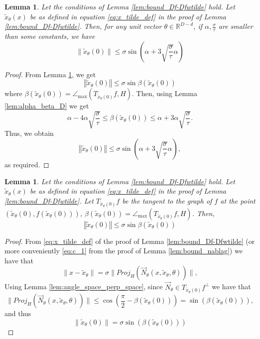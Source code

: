 \documentclass[12pt]{article}
\newtheorem{Lemma}[Theorem]{Lemma}
\theoremstyle{remark}
\newcommand{\RR}{\mathbb{R}}
\newcommand{\norm}[1]{\left\Vert #1 \right\Vert}
\newcommand{\wtilde}[1]{\widetilde{#1}}
\newcommand{\maxangle}{\angle_{\max}}
\begin{document}
\begin{appendices}
\begin{Lemma}\label{lem:wtilde_x_bound_clean_D}
Let the conditions of Lemma \ref{lem:bound_Df-Dfwtilde} hold. Let $\wtilde x_\theta(x)$ be as defined in equation \eqref{eq:x_tilde_def} in the proof of Lemma \ref{lem:bound_Df-Dfwtilde}.
Then, for any unit vector $\theta\in \RR^{D-d}$, if $\alpha, \frac{\sigma}{\tau}$ are smaller than some constants, we have
	\begin{equation*}
	\|\wtilde{x}_\theta(0)\| \leq \sigma \sin (\alpha + 3\sqrt{\frac{\sigma}{\tau}}\alpha)
	\end{equation*}
\end{Lemma}
\begin{proof}
	From Lemma \ref{lem:x_tilde_bound_beta_D}, we get
	\begin{equation}\label{eq:xtilde_alpha_bound}
	\norm{\wtilde{x}_\theta(0)} \leq \sigma \sin \beta (\wtilde x_\theta(0)) 
	\end{equation}
	where $ \beta (\wtilde x_\theta(0)) = \maxangle(T_{\wtilde x_{\theta}(0)}f, H) $.
	Then, using Lemma \ref{lem:alpha_beta_D} we get
	\[
	\alpha - 4\alpha \sqrt{\frac{\sigma}{\tau}}  \leq \beta(\wtilde x_\theta(0)) \leq \alpha + 3\alpha\sqrt{\frac{\sigma}{\tau}}
	.\]
	Thus, we obtain
	\[
	\norm{\wtilde x_\theta(0)} \leq \sigma \sin (\alpha + 3\sqrt{\frac{\sigma}{\tau}}\alpha)
	,\]
	as required.
\end{proof}

\begin{Lemma}\label{lem:x_tilde_bound_beta_D}
Let the conditions of Lemma \ref{lem:bound_Df-Dfwtilde} hold. Let $\wtilde x_\theta(x)$ be as defined in equation \eqref{eq:x_tilde_def} in the proof of Lemma \ref{lem:bound_Df-Dfwtilde}.
Let $ T_{\wtilde x_\theta(0)}f $ be the tangent to the graph of $ f $ at the point $ (\wtilde x_\theta(0), f(\wtilde x_\theta(0))) $, $ \beta(\wtilde x_\theta(0)) =  \maxangle(T_{\wtilde x_\theta(0)}f, H)$.
	Then,
	\[
	\norm{\wtilde x_\theta(0) } \leq \sigma \sin \beta(\wtilde x_\theta(0))
	\]
\end{Lemma}
\begin{proof}
From \eqref{eq:x_tilde_def} of the proof of Lemma \ref{lem:bound_Df-Dfwtilde} (or more conveniently \eqref{eq:c_1} from the proof of Lemma \ref{lem:bound_nablag}) we have that 
\[
\|x-\wtilde{x}_\theta\| = \sigma \|Proj_H(\vec N_\theta(x,\wtilde{x}_\theta,\theta))\|,
\]
Using Lemma \ref{lem:angle_space_perp_space}, since $\vec N_\theta \in T_{\wtilde x_\theta(0)}f^\perp$ we have that 
\[
\|Proj_H(\vec N_\theta(x,\wtilde{x}_\theta,\theta))\| \leq \cos (\frac{\pi}{2}  - \beta(\wtilde x_\theta(0))) = \sin(\beta(\wtilde x_\theta(0))),
\]
and thus
\[
\|\wtilde{x}_\theta(0)\| = \sigma \sin(\beta(\wtilde x_\theta(0)))
\]
\end{proof}



\end{appendices}
\end{document}
